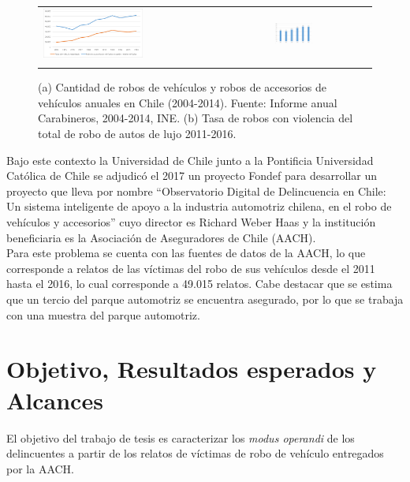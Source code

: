 \documentclass[letterpaper,12pt,oneside]{book} %
\begin{document}
\begin{figure}[h]
\begin{tabular}{p{}p{}}
\includegraphics[width=0.45\textwidth]{img/business/cantidad_robos.png} &
\includegraphics[width=0.40\textwidth]{img/business/tasa_robos_violencia.png}\\
 \centering{(a)} & \centering{(b)}\\
\end{tabular}

\caption{(a) Cantidad de robos de vehículos y robos de accesorios de vehículos anuales en Chile (2004-2014). Fuente: Informe anual Carabineros, 2004-2014, INE. (b) Tasa de robos con violencia del total de robo de autos de lujo 2011-2016.} %
\label{img:antecedente}
\end{figure}

Bajo este contexto la Universidad de Chile junto a la Pontificia Universidad Católica de Chile se adjudicó el 2017 un proyecto Fondef para desarrollar un proyecto que lleva por nombre ``Observatorio Digital de Delincuencia en Chile: Un sistema inteligente de apoyo a la industria automotriz chilena, en el robo de vehículos y accesorios'' cuyo director es Richard Weber Haas y la institución beneficiaria es la Asociación de Aseguradores de Chile (AACH).\\

Para este problema se cuenta con las fuentes de datos de la AACH, lo que corresponde a relatos de las víctimas del robo de sus vehículos desde el 2011 hasta el 2016, lo cual corresponde a 49.015 relatos. Cabe destacar que se estima que un tercio del parque automotriz se encuentra asegurado, por lo que se trabaja con una muestra del parque automotriz.

\section{Objetivo, Resultados esperados y Alcances}
El objetivo del trabajo de tesis es caracterizar los \textit{modus operandi} de los delincuentes a partir de los relatos de víctimas de robo de vehículo entregados por la AACH.\\
\end{document}
